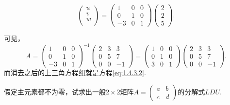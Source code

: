﻿\documentclass{book} \usepackage{exsheets} \usepackage{xeCJK}
\begin{document}
\begin{solution}
\begin{equation}
\begin{pmatrix}
      u\\
      v\\
      w\\
    \end{pmatrix}=
    \begin{pmatrix}
      1&0&0\\
      0&1&0\\
      -3&0&1
    \end{pmatrix}
    \begin{pmatrix}
      2\\
      2\\
      5
    \end{pmatrix}.
  \end{equation}
\end{solution}
可见，
$$
A=
\begin{pmatrix}
  1&0&0\\
  0&1&0\\
  -3&0&1
\end{pmatrix}^{-1}
\begin{pmatrix}
  2&3&3\\
  0&5&7\\
  0&0&-1
\end{pmatrix}=
\begin{pmatrix}
  1&0&0\\
  0&1&0\\
  3&0&1
\end{pmatrix}
\begin{pmatrix}
  2&3&3\\
  0&5&7\\
  0&0&-1
\end{pmatrix}.
$$
而消去之后的上三角方程组就是方程\eqref{eq:1.4.3.2}.
\begin{question}
  假定主元素都不为零，试求出一般$2\times 2$矩阵$A=
  \begin{pmatrix}
    a&b\\
    c&d
  \end{pmatrix}
  $的分解式$LDU$.
\end{question}
\end{document}
